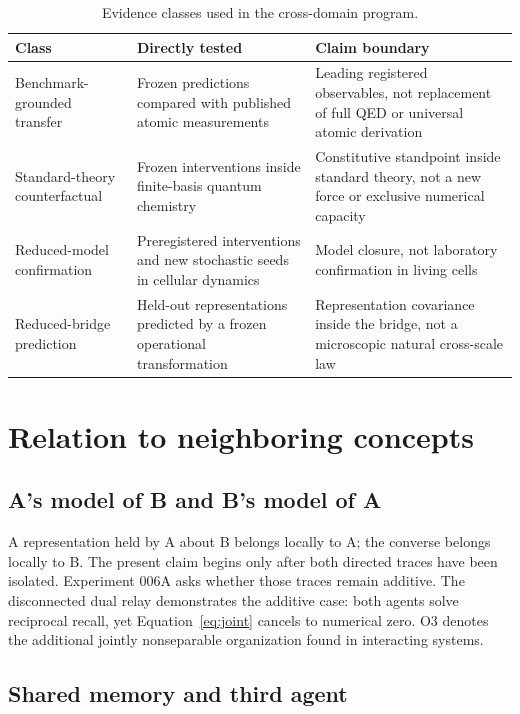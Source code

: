 \documentclass[11pt,a4paper]{article}
\begin{document}
\begin{table}[H]
\centering
\footnotesize
\caption{Evidence classes used in the cross-domain program.}
\label{tab:evidence-classes}
\begin{tabularx}{\textwidth}{@{}>{\raggedright\arraybackslash}p{2.8cm}>{\raggedright\arraybackslash}X>{\raggedright\arraybackslash}p{4.1cm}@{}}
\toprule
Class & Directly tested & Claim boundary \\
\midrule
Benchmark-grounded transfer & Frozen predictions compared with published atomic measurements & Leading registered observables, not replacement of full QED or universal atomic derivation \\
Standard-theory counterfactual & Frozen interventions inside finite-basis quantum chemistry & Constitutive standpoint inside standard theory, not a new force or exclusive numerical capacity \\
Reduced-model confirmation & Preregistered interventions and new stochastic seeds in cellular dynamics & Model closure, not laboratory confirmation in living cells \\
Reduced-bridge prediction & Held-out representations predicted by a frozen operational transformation & Representation covariance inside the bridge, not a microscopic natural cross-scale law \\
\bottomrule
\end{tabularx}
\end{table}

\section{Relation to neighboring concepts}

\subsection{A's model of B and B's model of A}

A representation held by A about B belongs locally to A; the converse belongs locally to B. The present claim begins only after both directed traces have been isolated. Experiment 006A asks whether those traces remain additive. The disconnected dual relay demonstrates the additive case: both agents solve reciprocal recall, yet Equation~\eqref{eq:joint} cancels to numerical zero. O3 denotes the additional jointly nonseparable organization found in interacting systems.

\subsection{Shared memory and third agent}
\end{document}

